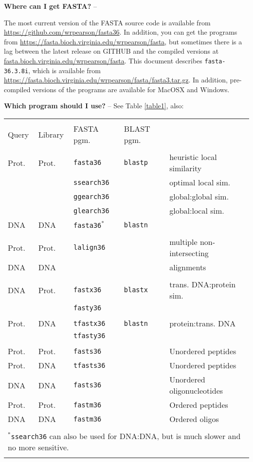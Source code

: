 \documentclass[11pt]{article}
\newcommand{\CURRENT}{fasta-36.3.8i}
\begin{document}
{\noindent}\textbf{Where can I get FASTA?} --

The most current version of the FASTA source code is available from
\url{https://github.com/wrpearson/fasta36}.  In addition, you can get
the programs from \url{https://fasta.bioch.virginia.edu/wrpearson/fasta},
but sometimes there is a lag between the latest release on GITHUB and
the compiled versions at \url{fasta.bioch.virginia.edu/wrpearson/fasta}.  This document
describes \texttt{\CURRENT}, which is available from
\url{https://fasta.bioch.virginia.edu/wrpearson/fasta/fasta3.tar.gz}.  In
addition, pre-compiled versions of the programs are available for
MacOSX and Windows.

{\noindent}\textbf{Which program should I use?} -- See Table \ref{table1}, also:\\

\begin{tabular}{l l l l l }
\hline \\[-1.0ex]
Query & Library & FASTA pgm. & BLAST pgm. & \\[1.2ex]
\hline \\[-1.0ex]
Prot. & Prot. & \texttt{fasta36} & \texttt{blastp} & heuristic local similarity \\
 &  & \texttt{ssearch36} &  & optimal local sim.\\
 &  & \texttt{ggearch36} &  & global:global sim. \\
 &  & \texttt{glearch36} &  & global:local sim.\\
DNA & DNA & \texttt{fasta36}$^*$ & \texttt{blastn} & \\[1.2ex]
\hline \\[-1.0ex]
Prot. & Prot. & \texttt{lalign36} & & multiple non-intersecting \\
DNA & DNA & & & alignments \\[1.2ex]
\hline \\[-1.0ex]
DNA & Prot. & \texttt{fastx36} & \texttt{blastx} & trans. DNA:protein sim. \\ 
 &  & \texttt{fasty36} & & \\[1.2ex]
\hline \\[-1.0ex]
Prot. & DNA & \texttt{tfastx36} & \texttt{blastn} & protein:trans. DNA \\
 &  & \texttt{tfasty36} & & \\[1.2ex]
\hline \\[-1.0ex]
Prot. & Prot. & \texttt{fasts36} & & Unordered peptides \\
Prot. & DNA & \texttt{tfasts36} & & Unordered peptides \\
DNA & DNA & \texttt{fasts36} & & Unordered oligonucleotides \\
Prot. & Prot. & \texttt{fastm36} & & Ordered peptides \\
DNA & DNA & \texttt{fastm36} & & Ordered oligos \\[1.2 ex]
\hline \\[-1.0ex]
\multicolumn{5}{l}{$^*$\texttt{ssearch36} can also be used for DNA:DNA, but is much slower and no more sensitive.}\\[0.2ex]
\hline \\
\end{tabular}
\end{document}
